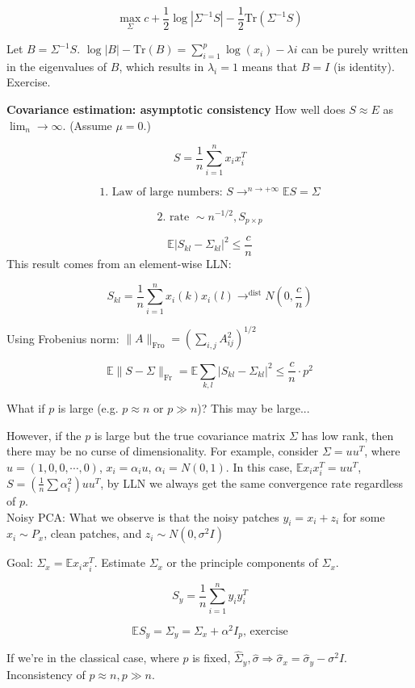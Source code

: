 \documentclass[12pt]{article}
\theoremstyle{plain}
\begin{document}
$$ \max_{\Sigma} c + \frac{1}{2} \log |\Sigma^{-1}S| - \frac{1}{2} \text{Tr} ( \Sigma^{-1} S) $$

Let $B = \Sigma^{-1}S$. $\log|B| - \text{Tr}(B) = \sum_{i=1}^p \log(x_i) - \lambda i$ can be purely written in the eigenvalues of $B$, which results in $\lambda_i=1$ means that $B = I$ (is identity). Exercise.

\textbf{Covariance estimation: asymptotic consistency} How well does $S \approx E$ as $\lim_n \rightarrow \infty$. (Assume $\mu=0$.)

$$ S = \frac{1}{n} \sum_{i=1}^n x_i x_i^T $$

$$ \text{1. Law of large numbers: }S \rightarrow^{n\rightarrow + \infty} \mathbb{E}S = \Sigma$$

$$ \text{2. rate } \sim n^{-1/2}, S_{p \times p} $$

$$ \mathbb{E} | S_{kl} - \Sigma_{kl}|^2 \leq \frac{c}{n} $$
This result comes from an element-wise LLN:

$$ S_{kl} = \frac{1}{n} \sum_{i=1}^n x_i(k) x_i(l)  \rightarrow^\text{dist} N(0, \frac{c}{n})$$

Using Frobenius norm: $\| A \|_\text{Fro} = (\sum_{i,j} A_{ij}^2)^{1/2}$

$$ \mathbb{E} \| S-\Sigma \|_\text{Fr} = \mathbb{E} \sum_{k,l} |S_{kl} - \Sigma_{kl} |^2 \leq \frac{c}{n} \cdot p^2$$

What if $p$ is large (e.g. $p \approx n$ or $p \gg n$)? This may be large...

However, if the $p$ is large but the true covariance matrix $\Sigma$ has low rank, then there may be no curse of dimensionality. For example, consider
$\Sigma = uu^T$, where $u = (1,0,0,\cdots,0)$, $x_i = \alpha_i u$, $\alpha_i = N(0,1)$. In this case, $\mathbb{E}x_i x_i^T = uu^T$, $S = (\frac{1}{n}\sum \alpha_i^2)uu^T$, by LLN we always get the same convergence rate regardless of $p$.\\
Noisy PCA: What we observe is that the noisy patches $y_i = x_i + z_i$ for some $x_i \sim P_x$, clean patches, and $z_i \sim N(0, \sigma^2I)$

Goal: $\Sigma_x = \mathbb{E}x_i x_i^T$. Estimate $\Sigma_x$ or the principle components of $\Sigma_x$.

$$ S_y = \frac{1}{n} \sum_{i=1}^n y_i y_i^T$$

$$ \mathbb{E}S_y = \Sigma_y = \Sigma_x + \alpha^2 I_p \text{, exercise} $$

If we're in the classical case, where $p$ is fixed, $\hat{\Sigma}_y, \hat{\sigma} \Rightarrow \hat{\sigma}_x = \hat{\sigma}_y - \sigma^2 I$. Inconsistency of $p \approx n, p \gg n$.
\end{document}
